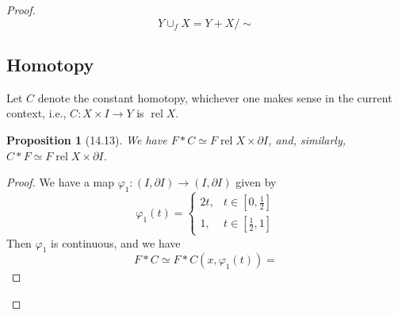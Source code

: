 \documentclass[reqno]{amsart}
\theoremstyle{plain}%
\newtheorem{proposition}[theorem]{Proposition}
\theoremstyle{definition}
\theoremstyle{remark}
\DeclareMathOperator{\rel}{rel}
\begin{document}
     \begin{proof}
        \[
        Y \cup_f X = Y + X / \sim
        \] 

        \subsection{Homotopy}
        Let $C$ denote the constant homotopy, whichever one makes sense
        in the current context, i.e., $C  \colon X \times I \to Y$ is $\rel X$.
        \begin{proposition}[14.13]
            We have $F * C \simeq F \rel X \times \partial I$, and, similarly,
            $C * F \simeq F \rel X \times \partial I$.
        \end{proposition}
        
        \begin{proof}
        We have a map $\varphi_1  \colon \left( I, \partial I \right) \to 
        \left( I, \partial I \right) $ given by
        \[
        \varphi_1 \left( t \right) 
        =
        \begin{cases}
            2t,& t \in \left[ 0, \frac{1}{2} \right] \\
            1,& t\in \left[ \frac{1}{2},1 \right] 
        \end{cases}
        \] 
        Then $\varphi_1$ is continuous, and we have
        \[
        F * C \simeq F * C \left( x, \varphi_1 (t) \right) 
        =
        \] 
        
        \end{proof}
         



     \end{proof}



%
\end{document}
